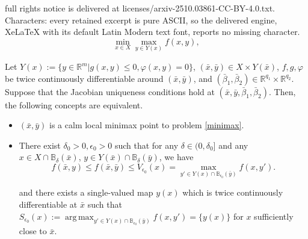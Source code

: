 \documentclass[10pt,a4paper]{amsart}
\DeclareMathOperator*{\argmax}{arg\,max}
\begin{document}
full rights notice is delivered at licenses/arxiv-2510.03861-CC-BY-4.0.txt. Characters: every retained excerpt is pure ASCII, so the delivered engine, XeLaTeX with its default Latin Modern text font, reports no missing character.
\begin{equation}\label{minimax}\tag{Min-Max}
	\min_{x\in X} \max_{y\in Y(x)} f(x,y),
\end{equation}

\begin{proposition}\label{prop4.1}
Let $Y(x):=\{y \in \mathbb{R}^m|g(x,y)\leq 0, \varphi(x,y)=0\}$, $(\bar x,\bar y) \in X \times Y(\bar x)$, $f,g,\varphi$ be twice continuously differentiable around $(\bar x,\bar y)$, and $\left(\bar \beta_1, \bar \beta_2 \right) \in \mathbb{R}^{q_1} \times \mathbb{R}^{q_2}$. Suppose that the Jacobian uniqueness conditions hold at $(\bar x,\bar y,\bar \beta_1,\bar \beta_2)$. Then, the following concepts are equivalent.
\begin{itemize}
\item[(i)] $(\bar x,\bar y)$ is a calm local minimax point to problem \eqref{minimax}.


\item[(ii)] There exist $\delta_0>0, \epsilon_0>0$ such that for any $\delta\in(0, \delta_0]$ and any $x\in X\cap \mathbb{B}_{\delta}(\bar{x})$, $y\in Y(\bar x)\cap \mathbb{B}_{\delta}(\bar{y})$, we have
\begin{equation} \label{ii} f(\bar{x}, y) \leq f(\bar{x},\bar{y})
				\leq V_{\epsilon_0}(x)=\max_{y' \in  Y(x)\cap\mathbb{B}_{\epsilon_0}(\bar y)} f (x, y' ).
				\end{equation}

and  there exists a single-valued map $y(x)$ which is twice continuously differentiable at $\bar x$ such that $S_{\epsilon_0}(x):=\argmax_{y' \in  Y(x)\cap\mathbb{B}_{\epsilon_0}(\bar y)} f (x, y' )=\{y(x)\}$ for $x$ sufficiently close to  $\bar x$.



\end{itemize}
\end{proposition}
\end{document}
